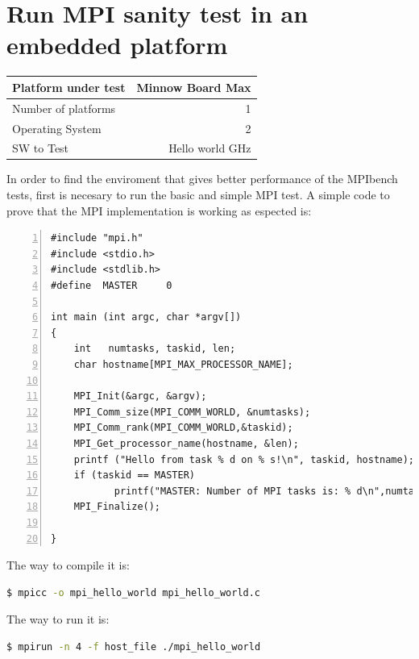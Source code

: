 \section{Run MPI sanity test in an embedded platform}


    \begin{center}
    \begin{tabular}{ | l | r |}
        \hline
        Platform under test & Minnow Board  Max \\ \hline
        Number of platforms  & 1  \\ \hline
        Operating System & 2  \\ \hline
        SW to Test & Hello world GHz  \\ \hline
    \end{tabular}
    \end{center}


In order to find the enviroment that gives better performance of the MPIbench
tests, first is necesary to run the basic and simple MPI test. A simple code to
prove that the MPI implementation is working as espected is:

\begin{lstlisting}[frame=single,numbers=left,breaklines=true,basicstyle=\tiny]
#include "mpi.h"
#include <stdio.h>
#include <stdlib.h>
#define  MASTER     0

int main (int argc, char *argv[])
{
    int   numtasks, taskid, len;
    char hostname[MPI_MAX_PROCESSOR_NAME];

    MPI_Init(&argc, &argv);
    MPI_Comm_size(MPI_COMM_WORLD, &numtasks);
    MPI_Comm_rank(MPI_COMM_WORLD,&taskid);
    MPI_Get_processor_name(hostname, &len);
    printf ("Hello from task % d on % s!\n", taskid, hostname);
    if (taskid == MASTER)
           printf("MASTER: Number of MPI tasks is: % d\n",numtasks);
    MPI_Finalize();

}
\end{lstlisting}

The way to compile it is: 

\begin{lstlisting}[frame=single,language=bash]
  $ mpicc -o mpi_hello_world mpi_hello_world.c
\end{lstlisting}


The way to run it is: 

\begin{lstlisting}[frame=single,language=bash]
  $ mpirun -n 4 -f host_file ./mpi_hello_world
\end{lstlisting}

